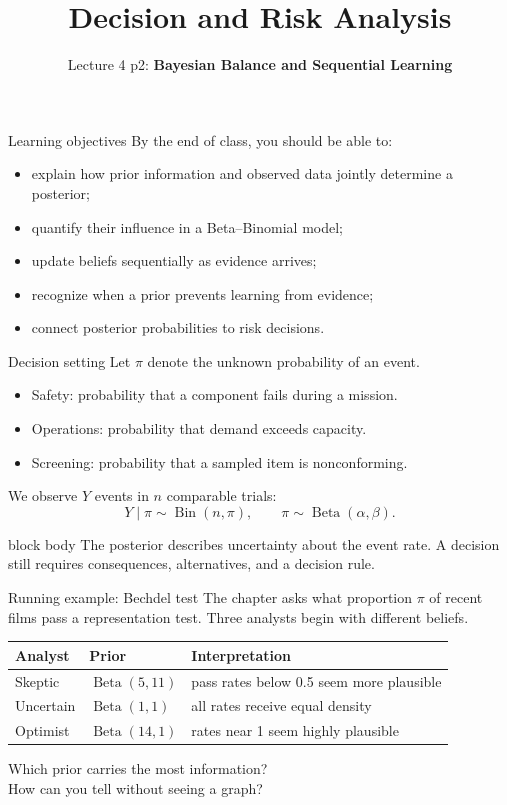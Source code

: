 \documentclass[aspectratio=43,11pt]{beamer}
\title{Decision and Risk Analysis}
\subtitle{Lecture 4 p2: \textbf{Bayesian Balance and Sequential Learning}}
\author{\emph{}}
\date{\color{aggiemaroon}{
DAEN 427 / ISEN 427 / ISEN 627\\
\textbf{Alexander Abuabara}\\
Fall 2026
}}
\newcommand{\riskbox}[1]{\begin{beamercolorbox}[rounded=true,sep=.8em]{block body} #1\end{beamercolorbox}}
\begin{document}
\begin{frame}\titlepage\end{frame}

\begin{frame}{Learning objectives}
By the end of class, you should be able to:
\begin{itemize}
  \item explain how prior information and observed data jointly determine a posterior;
  \item quantify their influence in a Beta--Binomial model;
  \item update beliefs sequentially as evidence arrives;
  \item recognize when a prior prevents learning from evidence;
  \item connect posterior probabilities to risk decisions.
\end{itemize}
\end{frame}

\begin{frame}{Decision setting}
Let $\pi$ denote the unknown probability of an event.
\begin{itemize}
  \item Safety: probability that a component fails during a mission.
  \item Operations: probability that demand exceeds capacity.
  \item Screening: probability that a sampled item is nonconforming.
\end{itemize}
We observe $Y$ events in $n$ comparable trials:
\[
Y\mid \pi \sim \operatorname{Bin}(n,\pi), \qquad
\pi\sim\operatorname{Beta}(\alpha,\beta).
\]
\riskbox{The posterior describes uncertainty about the event rate. A decision still requires consequences, alternatives, and a decision rule.}
\end{frame}













\begin{frame}{Running example: Bechdel test}
The chapter asks what proportion $\pi$ of recent films pass a representation test. Three analysts begin with different beliefs.
\begin{center}
\begin{tabular}{lll}
\toprule
Analyst & Prior & Interpretation \\
\midrule
Skeptic & $\operatorname{Beta}(5,11)$ & pass rates below 0.5 seem more plausible \\
Uncertain & $\operatorname{Beta}(1,1)$ & all rates receive equal density \\
Optimist & $\operatorname{Beta}(14,1)$ & rates near 1 seem highly plausible \\
\bottomrule
\end{tabular}
\end{center}
\vspace{.5em}
Which prior carries the most information?\\
How can you tell without seeing a graph?
\end{frame}
\end{document}
